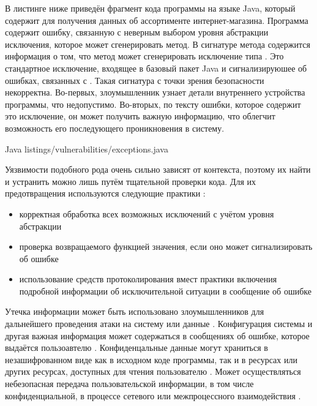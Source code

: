 %
В листинге ниже приведён фрагмент кода программы на языке Java, который содержит  
для получения данных об ассортименте интернет-магазина. 
%
Программа содержит ошибку, связанную с неверным выбором уровня абстракции исключения, которое может 
сгенерировать метод. 
%
В сигнатуре метода  содержится информация о том, что метод может 
сгенерировать исключение типа . 
%
Это стандартное исключение, входящее в базовый пакет Java и сигнализируюшее об ошибках, связанных 
с . 
%
Такая сигнатура с точки зрения безопасности некорректна. 
%
Во-первых, злоумышленник узнает детали внутреннего устройства программы, что недопустимо. 
%
Во-вторых, по тексту ошибки, которое содержит это исключение, он может получить важную информацию, 
что облегчит возможность его последующего проникновения в систему. 

	{Java}
	{listings/vulnerabilities/exceptions.java}

%
Уязвимости подобного рода очень сильно зависят от контекста, поэтому их найти и устранить можно 
лишь путём тщательной проверки кода. 
%
Для их предотвращения используются следующие практики : 
\begin{itemize}
	\item корректная обработка всех возможных исключений с учётом уровня абстракции 
	\item проверка возвращаемого функцией значения, если оно может сигнализировать об ошибке 
	\item использование средств протоколирования вмест практики включения подробной информации 
		об исключительной ситуации в сообщение об ошибке 
\end{itemize}



%
Утечка информации может быть использовано злоумышленников для дальнейшего проведения атаки 
на систему или данные . 
%
Конфигурация системы и другая важная информация  может содержаться в сообщениях об ошибке, которое 
выдаётся пользоавтелю . 
%
Конфиденцальные данные могут храниться в незашифрованном виде как в исходном коде программы, так и 
в ресурсах или других ресурсах, доступных для чтения пользователю . 
%
Может осуществляться небезопасная передача пользовательской  информации, в том числе 
конфиденциальной, в процессе сетевого или межпроцессного взаимодействия .

